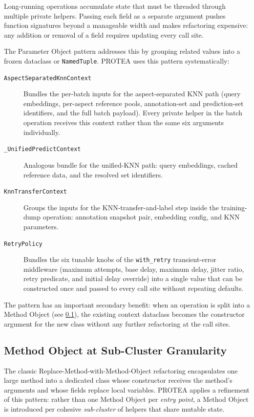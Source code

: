 Long-running operations accumulate state that must be threaded through
multiple private helpers. Passing each field as a separate argument pushes
function signatures beyond a manageable width and makes refactoring
expensive: any addition or removal of a field requires updating every
call site.

The Parameter Object pattern addresses this by grouping related values into
a frozen dataclass or \texttt{NamedTuple}. PROTEA uses this pattern
systematically:

\begin{description}
  \item[\texttt{AspectSeparatedKnnContext}] Bundles the per-batch inputs
    for the aspect-separated KNN path (query embeddings, per-aspect
    reference pools, annotation-set and prediction-set identifiers, and the
    full batch payload). Every private helper in the batch operation receives
    this context rather than the same six arguments individually.
  \item[\texttt{\_UnifiedPredictContext}] Analogous bundle for the
    unified-KNN path: query embeddings, cached reference data, and the
    resolved set identifiers.
  \item[\texttt{KnnTransferContext}] Groups the inputs for the
    KNN-transfer-and-label step inside the training-dump operation:
    annotation snapshot pair, embedding config, and KNN parameters.
  \item[\texttt{RetryPolicy}] Bundles the six tunable knobs of the
    \texttt{with\_retry} transient-error middleware (maximum attempts, base
    delay, maximum delay, jitter ratio, retry predicate, and initial delay
    override) into a single value that can be constructed once and passed to
    every call site without repeating defaults.
\end{description}

The pattern has an important secondary benefit: when an operation is split
into a Method Object (see \cref{subsec:method-object-subcluster}), the
existing context dataclass becomes the constructor argument for the new
class without any further refactoring at the call sites.

\subsection{Method Object at Sub-Cluster Granularity}
\label{subsec:method-object-subcluster}

The classic Replace-Method-with-Method-Object refactoring encapsulates one
large method into a dedicated class whose constructor receives the method's
arguments and whose fields replace local variables. PROTEA applies a
refinement of this pattern: rather than one Method Object per \textit{entry
point}, a Method Object is introduced per cohesive \textit{sub-cluster} of
helpers that share mutable state.

